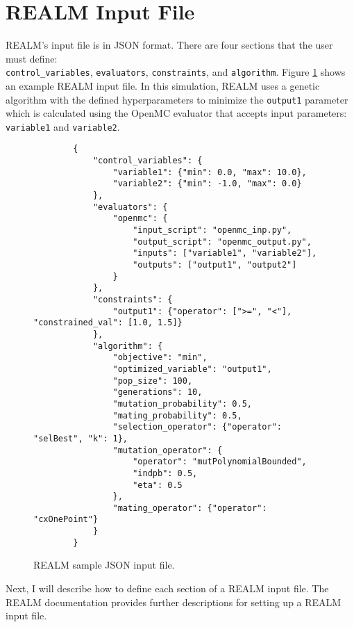 \section{REALM Input File}
REALM's input file is in JSON format. 
There are four sections that the user must define: \\ \texttt{control\_variables}, 
\texttt{evaluators}, \texttt{constraints}, and \texttt{algorithm}. 
Figure \ref{fig:realm-input} shows an example REALM input file. 
In this simulation, REALM uses a genetic algorithm with the defined 
hyperparameters to minimize the \texttt{output1} parameter which is 
calculated using the OpenMC evaluator that accepts input parameters: 
\texttt{variable1} and \texttt{variable2}. 
\begin{figure}[]
    \begin{verbatim}
        {
            "control_variables": {
                "variable1": {"min": 0.0, "max": 10.0}, 
                "variable2": {"min": -1.0, "max": 0.0}
            }, 
            "evaluators": {
                "openmc": {
                    "input_script": "openmc_inp.py",
                    "output_script": "openmc_output.py", 
                    "inputs": ["variable1", "variable2"],
                    "outputs": ["output1", "output2"]
                }
            }, 
            "constraints": {
                "output1": {"operator": [">=", "<"], "constrained_val": [1.0, 1.5]}
            }, 
            "algorithm": {
                "objective": "min", 
                "optimized_variable": "output1", 
                "pop_size": 100, 
                "generations": 10, 
                "mutation_probability": 0.5,
                "mating_probability": 0.5,
                "selection_operator": {"operator": "selBest", "k": 1},
                "mutation_operator": {
                    "operator": "mutPolynomialBounded",
                    "indpb": 0.5,
                    "eta": 0.5
                },
                "mating_operator": {"operator": "cxOnePoint"}
            }
        }
    \end{verbatim}
    \caption{\acrfull{REALM} sample JSON input file.}
    \label{fig:realm-input}
\end{figure}

Next, I will describe how to define each section of a REALM input file. 
The \gls{REALM} documentation \cite{chee_arfcrealm_2021} provides further 
descriptions for setting up a \gls{REALM} input file.

